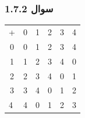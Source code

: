 \documentclass{article}
\begin{document}
\subsubsection{سوال 1.7.2}
\begin{latin}
\begin{table}[H]
\centering
\begin{tabular}{cccccc}
+                      & 0                      & 1                      & 2                      & 3                      & \multicolumn{1}{l}{4}  \\ \cline{2-6} 
\multicolumn{1}{c|}{0} & \multicolumn{1}{c|}{0} & \multicolumn{1}{c|}{1} & \multicolumn{1}{c|}{2} & \multicolumn{1}{c|}{3} & \multicolumn{1}{l|}{4} \\ \cline{2-6} 
\multicolumn{1}{c|}{1} & \multicolumn{1}{c|}{1} & \multicolumn{1}{c|}{2} & \multicolumn{1}{c|}{3} & \multicolumn{1}{c|}{4} & \multicolumn{1}{c|}{0} \\ \cline{2-6} 
\multicolumn{1}{c|}{2} & \multicolumn{1}{c|}{2} & \multicolumn{1}{c|}{3} & \multicolumn{1}{c|}{4} & \multicolumn{1}{c|}{0} & \multicolumn{1}{c|}{1} \\ \cline{2-6} 
\multicolumn{1}{c|}{3} & \multicolumn{1}{c|}{3} & \multicolumn{1}{c|}{4} & \multicolumn{1}{c|}{0} & \multicolumn{1}{c|}{1} & \multicolumn{1}{c|}{2} \\ \cline{2-6} 
\multicolumn{1}{l|}{4} & \multicolumn{1}{c|}{4} & \multicolumn{1}{c|}{0} & \multicolumn{1}{c|}{1} & \multicolumn{1}{c|}{2} & \multicolumn{1}{c|}{3} \\ \cline{2-6} 
\end{tabular}
\end{table}
\end{latin}
\end{document}
